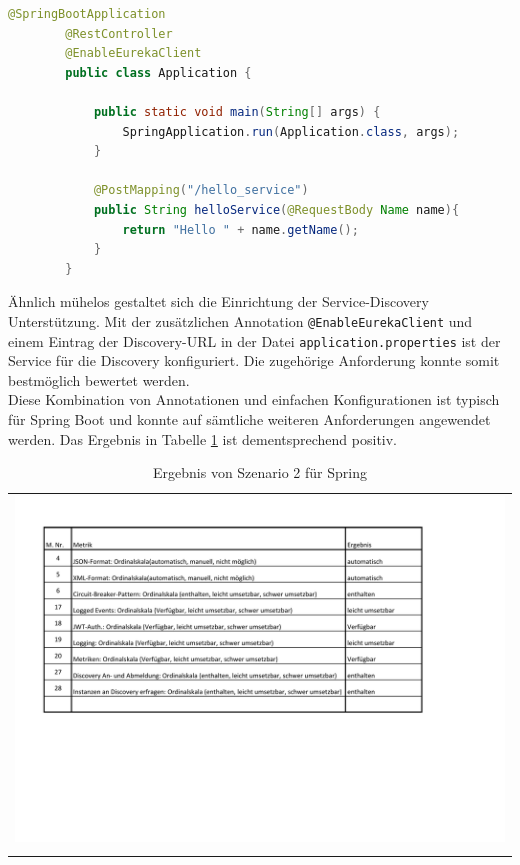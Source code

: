 \begin{minipage}{\linewidth}
	\begin{lstlisting}[caption={"Hello-Word" in Spring},label=SpringHello,language=JAVA] 
		@SpringBootApplication
		@RestController
		@EnableEurekaClient
		public class Application {
		
			public static void main(String[] args) {
				SpringApplication.run(Application.class, args);
			}
			
			@PostMapping("/hello_service")
			public String helloService(@RequestBody Name name){
				return "Hello " + name.getName();
			}
		}
	\end{lstlisting}
\end{minipage}

Ähnlich mühelos gestaltet sich die Einrichtung der Service-Discovery Unterstützung. Mit der zusätzlichen Annotation \lstinline|@EnableEurekaClient| und einem Eintrag der Discovery-URL in der Datei \lstinline|application.properties| ist der Service für die Discovery konfiguriert. Die zugehörige Anforderung konnte somit bestmöglich bewertet werden. \\
Diese Kombination von Annotationen und einfachen Konfigurationen ist typisch für Spring Boot und konnte auf sämtliche weiteren Anforderungen angewendet werden. Das Ergebnis in Tabelle \ref{Sz2ErgebnisSpring} ist dementsprechend positiv.

\begin{longtable}{c}
	\includegraphics[width=\linewidth]{Bilder/Sz2ErgebnisSpring.pdf} \\	
	\caption[Szenario 2 Ergebnis Spring]{Ergebnis von Szenario 2 für Spring}
	\label{Sz2ErgebnisSpring}\\
\end{longtable}
\FloatBarrier


